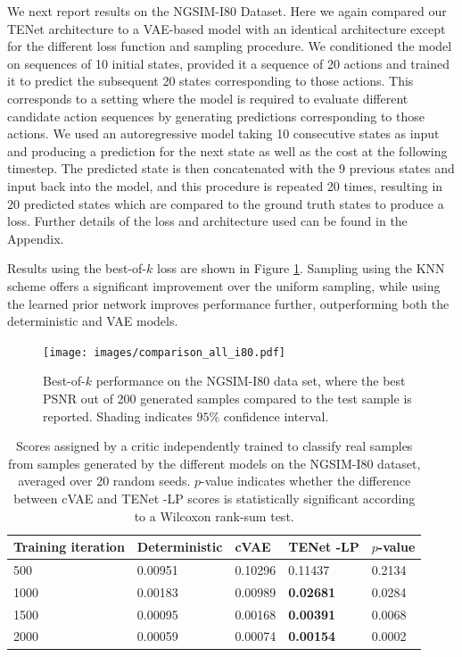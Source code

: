 \documentclass{article}
\newcommand{\modelname}{TENet }
\begin{document}
We next report results on the NGSIM-I80 Dataset. Here we again compared our \modelname architecture to a VAE-based model with an identical architecture except for the different loss function and sampling procedure.
We conditioned the model on sequences of 10 initial states, provided it a sequence of 20 actions and trained it to predict the subsequent 20 states corresponding to those actions.
This corresponds to a setting where the model is required to evaluate different candidate action sequences by generating predictions corresponding to those actions.
We used an autoregressive model taking 10 consecutive states as input and producing a prediction for the next state as well as the cost at the following timestep.
The predicted state is then concatenated with the 9 previous states and input back into the model, and this procedure is repeated 20 times, resulting in 20 predicted states which are compared to the ground truth states to produce a loss. Further details of the loss and architecture used can be found in the Appendix.

Results using the best-of-$k$ loss are shown in Figure \ref{best-of-k-i80}.
Sampling using the KNN scheme offers a significant improvement over the uniform sampling, while using the learned prior network improves performance further, outperforming both the deterministic and VAE models.

\begin{figure}[t!]
  \centering
  \texttt{[image: images/comparison\_all\_i80.pdf]}
  \caption{Best-of-$k$ performance on the NGSIM-I80 data set, where the best PSNR out of 200 generated samples compared to the test sample is reported. Shading indicates $95\%$ confidence interval. }
  \label{best-of-k-i80}
\end{figure}

\begin{table}[t!]
  \caption{Scores assigned by a critic independently trained to classify real samples from samples generated by the different models on the NGSIM-I80 dataset, averaged over 20 random seeds. $p$-value indicates whether the difference between cVAE and \modelname-LP scores is statistically significant according to a Wilcoxon rank-sum test.}
  \label{critic-table}
  \centering
  \begin{tabular}{l|l|lll}
    \toprule
    Training iteration     & Deterministic & cVAE & \modelname-LP & $p$-value \\
    \midrule
    500 & 0.00951 & 0.10296 & 0.11437 & 0.2134 \\
    1000 & 0.00183 & 0.00989 & \textbf{0.02681} & 0.0284 \\
    1500 & 0.00095 & 0.00168 & \textbf{0.00391} & 0.0068 \\
    2000 & 0.00059 & 0.00074 & \textbf{0.00154} & 0.0002 \\
    \bottomrule
  \end{tabular}
\end{table}
\end{document}
